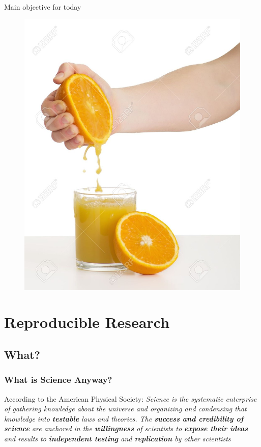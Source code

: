 \documentclass[10pt]{beamer}\usepackage[]{graphicx}\usepackage[]{color}
\begin{document}
\begin{frame}{Main objective for today}
\begin{figure}[h!]
\centering
\includegraphics[scale=0.40, keepaspectratio]{./juice}
\end{figure}
\end{frame}



\section{Reproducible Research}

\subsection{What?}

\begin{frame}

\frametitle{What is Science Anyway?}

\pause
\begin{block}{According to the American Physical Society:}
\emph{Science is the systematic enterprise of gathering knowledge about the universe and organizing and condensing that knowledge into \textbf{testable} laws and theories. The \textbf{success and credibility of science} are anchored in the \textbf{willingness} of scientists to \textbf{expose their ideas} and results to \textbf{independent testing} and \textbf{replication} by other scientists}
\end{block}

\end{frame}
\end{document}
